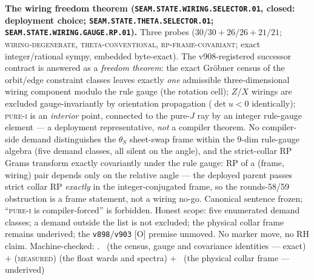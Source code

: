 \documentclass[11pt,a4paper]{article}
\theoremstyle{definition}
\begin{document}
\par\smallskip\noindent\textbf{The wiring freedom theorem
(\texttt{SEAM.STATE.WIRING.\allowbreak SELECTOR.01}, closed:
deployment choice;
\texttt{SEAM.STATE.THETA.\allowbreak SELECTOR.01};
\texttt{SEAM.STATE.WIRING.\allowbreak GAUGE.RP.01}).}
Three probes ($30/30 + 26/26 + 21/21$;
\textsc{wiring-degenerate}, \textsc{theta-conventional},
\textsc{rp-frame-covariant}; exact integer/rational sympy,
embedded byte-exact).  The v908-registered successor contract
is answered as a \emph{freedom theorem}: the exact Gr\"obner
census of the orbit/edge constraint classes leaves exactly
\emph{one} admissible three-dimensional wiring component modulo
the rule gauge (the rotation cell); $Z$/$X$ wirings are
excluded gauge-invariantly by orientation propagation
($\det u < 0$ identically); \textsc{pure-i} is an
\emph{interior} point, connected to the pure-$J$ ray by an
integer rule-gauge element --- a deployment representative,
\emph{not} a compiler theorem.  No compiler-side demand
distinguishes the $\theta_S$ sheet-swap frame within the
$9$-dim rule-gauge algebra (five demand classes, all silent on
the angle), and the strict-collar RP Grams transform exactly
covariantly under the rule gauge: RP of a (frame, wiring) pair
depends only on the relative angle --- the deployed parent
passes strict collar RP \emph{exactly} in the
integer-conjugated frame, so the rounds-58/59 obstruction is a
frame statement, not a wiring no-go.  Canonical sentence
frozen; ``\textsc{pure-i} is compiler-forced'' is forbidden.
Honest scope: five enumerated demand classes; a demand outside
the list is not excluded; the physical collar frame remains
underived; the \texttt{v898}/\texttt{v903} [O] premise
unmoved.  No marker move, no RH claim.
Machine-checked: .
\mE\ (the census, gauge and covariance identities --- exact)
$+$ (\textsc{measured}) (the float wards and spectra) $+$
\mO\ (the physical collar frame --- underived)
\par\smallskip
\end{document}
